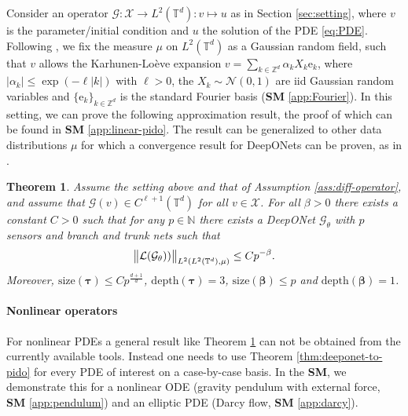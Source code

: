 \documentclass{article}
\numberwithin{equation}{section}
\newcommand{\size}{\mathrm{size}}
\newcommand{\depth}{\mathrm{depth}}
\newcommand{\fb}{\bm{\mathrm{e}}}
\newcommand{\T}{\mathbb{T}}
\newcommand{\N}{\mathbb{N}}
\newcommand{\Z}{\mathbb{Z}}
\newcommand{\cG}{\mathcal{G}}
\newcommand{\cL}{\mathcal{L}}
\newcommand{\cN}{\mathcal{N}}
\newcommand{\cX}{\mathcal{X}}
\newcommand{\trunk}{{\bm{\tau}}}
\newcommand{\branch}{{\bm{\beta}}}
\newcommand{\1}{\mathbbm{1}}
\newtheorem{theorem}{Theorem}[section]
\begin{document}
Consider an operator $\cG:\cX\to L^2(\T^d):v\mapsto u$ as in Section \ref{sec:setting}, where $v$ is the parameter/initial condition and $u$ the solution of the PDE \eqref{eq:PDE}. Following \cite{LMK1}, we fix the measure $\mu$ on $L^2(\T^d)$ as a Gaussian random field, such that $v$ allows the Karhunen-Loève expansion $v = \sum_{k\in \Z^d} \alpha_{k} X_k \fb_k$,
where $|\alpha_k|\le \exp(-\ell |k|)$ with $\ell > 0$, the $X_k\sim \cN(0,1)$ are iid Gaussian random variables and $\{\fb_k\}_{k\in \Z^d}$ is the standard Fourier basis (\textbf{SM} \ref{app:Fourier}). In this setting, we can prove the following approximation result, the proof of which can be found in \textbf{SM} \ref{app:linear-pido}. {\color{black} The result can be generalized to other data distributions $\mu$ for which a convergence result for DeepONets can be proven, as in \cite{LMK1}.}

\begin{theorem}\label{thm:linear-pido}
Assume the setting above and that of Assumption \ref{ass:diff-operator}, and assume that $\cG(v)\in C^{\ell+1}(\T^d)$ for all $v\in \cX$. For all $\beta>0$ there exists a constant $C>0$ such that for any $p\in\N$ there exists a DeepONet $\cG_\theta$ with $p$ sensors and branch and trunk nets such that
\begin{equation}
    \norm{\cL(\cG_\theta))}_{L^2(L^2(\T^d),\mu)}\leq Cp^{-\beta}.
\end{equation}
Moreover, $\size(\trunk) \leq Cp^{\frac{d+1}{d}}$, $\depth(\trunk) = 3$, $\size(\branch) \leq p$ and $\depth(\branch) = 1$. 
\end{theorem}


\paragraph{Nonlinear operators}

For nonlinear PDEs a general result like Theorem \ref{thm:linear-pido} can not be obtained from the currently available tools. Instead one needs to use Theorem \ref{thm:deeponet-to-pido} for every PDE of interest on a case-by-case basis. In the \textbf{SM}, we demonstrate this for a nonlinear ODE (gravity pendulum with external force, \textbf{SM} \ref{app:pendulum}) and an elliptic PDE (Darcy flow, \textbf{SM} \ref{app:darcy}). 
\end{document}
